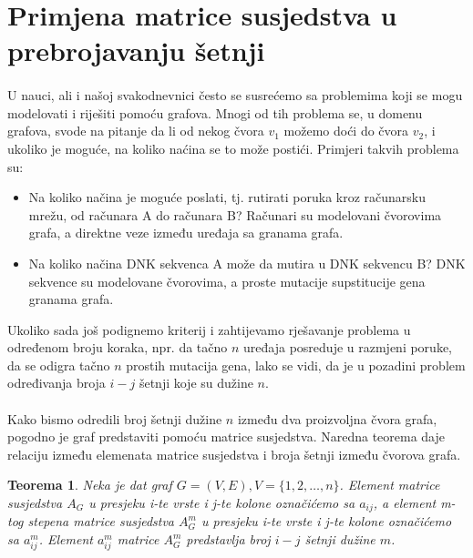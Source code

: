 \documentclass[11pt]{article}
\newtheorem{theorem}{Teorema}
\begin{document}
	\section{Primjena matrice susjedstva u prebrojavanju šetnji}
		\paragraph{}
		U nauci, ali i našoj svakodnevnici često se susrećemo sa problemima koji se mogu modelovati i riješiti pomoću grafova. 
		Mnogi od tih problema se, u domenu grafova, svode na pitanje da li od nekog čvora $v_1$ možemo doći do čvora $v_2$, i ukoliko je moguće, na koliko naćina se to može postići. Primjeri takvih problema su:
				\begin{itemize}
				\item Na koliko načina je moguće poslati, tj. rutirati poruka kroz računarsku mrežu, od računara A do računara B? Računari su modelovani čvorovima grafa, a direktne veze između uređaja sa granama grafa.
				\item Na koliko načina DNK sekvenca A može da mutira u DNK sekvencu B? DNK sekvence su modelovane čvorovima, a proste mutacije supstitucije gena granama grafa. 
				\end{itemize}
	
		Ukoliko sada još podignemo kriterij i zahtijevamo rješavanje problema u određenom broju koraka, npr. da tačno $n$ uređaja posreduje u razmjeni poruke, 
		da se odigra tačno $n$ prostih mutacija gena, lako se vidi, da je u pozadini problem određivanja broja $i-j$ šetnji koje su dužine $n$.
	
		\paragraph{}
		Kako bismo odredili broj šetnji dužine $n$ između dva proizvoljna čvora grafa, pogodno je graf predstaviti pomoću matrice susjedstva. 
		Naredna teorema daje relaciju između elemenata matrice susjedstva i broja šetnji između čvorova grafa.
	
		\begin{theorem}
			Neka je dat graf $G = (V, E), V = \{1, 2, \dots, n\}$. Element matrice susjedstva $A_G$ u presjeku i-te vrste i j-te kolone označićemo sa $a_{ij}$, 
			a element m-tog stepena matrice susjedstva $A_G^m$ u presjeku i-te vrste i j-te kolone označićemo sa $a_{ij}^m$. Element $a_{ij}^m$ matrice $A_G^m$ predstavlja broj $i-j$ šetnji dužine $m$. 
		\end{theorem}
		
\end{document}
